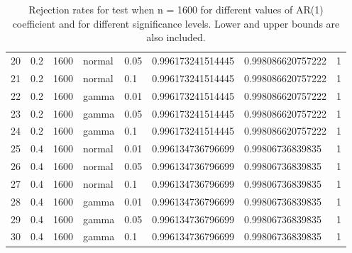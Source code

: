 \begin{table}[ht]
\begin{tabular}{rlllllll}
  20 & 0.2 & 1600 & normal & 0.05 & 0.996173241514445 & 0.998086620757222 & 1 \\ 
  21 & 0.2 & 1600 & normal & 0.1 & 0.996173241514445 & 0.998086620757222 & 1 \\ 
  22 & 0.2 & 1600 & gamma & 0.01 & 0.996173241514445 & 0.998086620757222 & 1 \\ 
  23 & 0.2 & 1600 & gamma & 0.05 & 0.996173241514445 & 0.998086620757222 & 1 \\ 
  24 & 0.2 & 1600 & gamma & 0.1 & 0.996173241514445 & 0.998086620757222 & 1 \\ 
  25 & 0.4 & 1600 & normal & 0.01 & 0.996134736796699 & 0.99806736839835 & 1 \\ 
  26 & 0.4 & 1600 & normal & 0.05 & 0.996134736796699 & 0.99806736839835 & 1 \\ 
  27 & 0.4 & 1600 & normal & 0.1 & 0.996134736796699 & 0.99806736839835 & 1 \\ 
  28 & 0.4 & 1600 & gamma & 0.01 & 0.996134736796699 & 0.99806736839835 & 1 \\ 
  29 & 0.4 & 1600 & gamma & 0.05 & 0.996134736796699 & 0.99806736839835 & 1 \\ 
  30 & 0.4 & 1600 & gamma & 0.1 & 0.996134736796699 & 0.99806736839835 & 1 \\ 
   \hline
\end{tabular}
\caption{Rejection rates for test when n = 1600 for 
                   different values of AR(1) coefficient and for different 
                   significance levels. Lower and upper bounds are also 
                   included.} 
\label{table:rr_1600}
\end{table}

